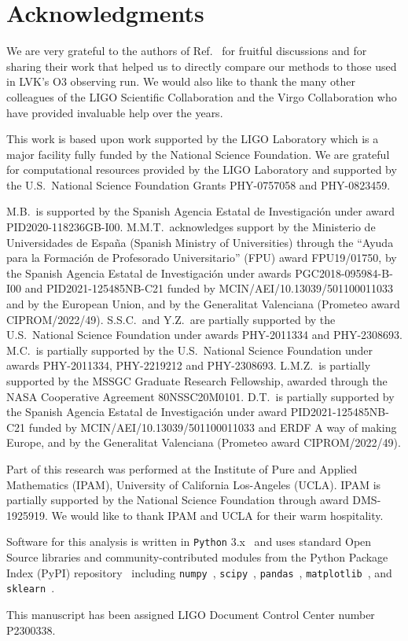 \section*{Acknowledgments}

We are very grateful to the authors of Ref.~\cite{Chatterjee:2019avs} for fruitful discussions and for sharing their work that helped us to directly compare
our methods to those used in \ac{LVK}'s \ac{O3} observing run. We would also like to thank the many other colleagues of the LIGO Scientific Collaboration and
the Virgo Collaboration who have provided invaluable help over the years.

This work is based upon work supported by the LIGO Laboratory which is a major facility fully funded by the National Science Foundation. We are grateful for computational resources provided by
the LIGO Laboratory and supported by the U.S.\ National Science Foundation Grants PHY-0757058 and PHY-0823459. 

M.B.\ is supported by the Spanish Agencia Estatal de Investigaci\'on under award PID2020-118236GB-I00. M.M.T.\ acknowledges support by the Ministerio de Universidades de Espa\~na (Spanish
Ministry of Universities) through the ``Ayuda para la Formaci\'on de Profesorado Universitario'' (FPU) award FPU19/01750, by the Spanish Agencia Estatal de Investigaci\'on under awards
PGC2018-095984-B-I00 and PID2021-125485NB-C21 funded by MCIN/AEI/10.13039/501100011033 and by the European Union, and by the Generalitat Valenciana (Prometeo award CIPROM/2022/49). S.S.C.\ and Y.Z.\ are partially supported by the U.S.\ National Science Foundation under awards PHY-2011334 and PHY-2308693. M.C.\ is partially supported by the U.S.\ National
Science Foundation under awards PHY-2011334, PHY-2219212 and PHY-2308693. L.M.Z.\ is partially supported by the MSSGC Graduate Research Fellowship, awarded through the NASA Cooperative
Agreement 80NSSC20M0101. D.T.~is partially supported by the Spanish Agencia Estatal de Investigaci\'on under award PID2021-125485NB-C21 funded by MCIN/AEI/10.13039/501100011033 and ERDF A way
of making Europe, and by the Generalitat Valenciana (Prometeo award CIPROM/2022/49).

Part of this research was performed at the Institute of Pure and Applied Mathematics (IPAM),  University of California Los-Angeles (UCLA). IPAM is partially supported by the National Science
Foundation through award DMS-1925919. We would like to thank IPAM and UCLA for their warm hospitality. 

Software for this analysis is written in \texttt{Python} 3.x~\cite{python3} and uses standard Open Source libraries and community-contributed modules from the Python Package Index (PyPI)
repository~\cite{pypi} including \texttt{numpy}~\cite{harris2020array}, \texttt{scipy}~\cite{2020SciPy-NMeth}, \texttt{pandas}~\cite{reback2020pandas,mckinney-proc-scipy-2010},
\texttt{matplotlib}~\cite{Hunter:2007ouj}, and \texttt{sklearn}~\cite{scikit-learn}.

This manuscript has been assigned LIGO Document Control Center number P2300338.





